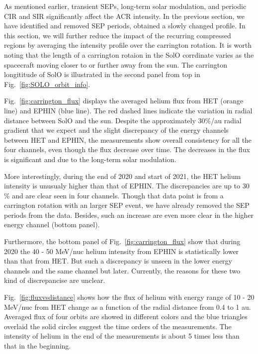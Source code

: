As mentioned earlier, transient \acp{SEP}, long-term solar modulation, and periodic \ac{CIR} and \ac{SIR} significantly affect the \ac{ACR} intensity. In the previous section, we have identified and removed \ac{SEP} periods, obtained a slowly changed profile. In this section, we will further reduce the impact of the recurring compressed regions by averaging the intensity profile over the carrington rotation. It is worth noting that the length of a carrington rotaion in the \ac{SolO} corrdinate varies as the spacecraft moving closer to or further away from the sun. The carrington longititude of \ac{SolO} is illustrated in the second panel from top in Fig.~\ref{fig:SOLO_orbit_info}. 

Fig.~\ref{fig:carrington_flux} displays the averaged helium flux from \ac{HET} (orange line) and \ac{EPHIN} (blue line). The red dashed lines indicate the variation in radial distance between \ac{SolO} and the sun. Despite the approximately 30\%/au radial gradient \citep{Rankin2021ApJ} that we expect and the slight discrepancy of the energy channels between \ac{HET} and \ac{EPHIN}, the measurements show overall consistency for all the four channels, even though the flux decrease over time. The decreases in the flux is significant and due to the long-term solar modulation. 

More interestingly, during the end of 2020 and start of 2021, the \ac{HET} helium intensity is unusualy higher than that of \ac{EPHIN}. The discrepancies are up to 30 \% and are clear seen in four channels. Though that data point is from a carrington rotation with an larger \ac{SEP} event, we have already removed the \ac{SEP} periods from the data. Besides, such an increase are even more clear in the higher energy channel (bottom panel). 

Furthermore, the bottom panel of Fig.~\ref{fig:carrington_flux} show that during 2020  the 40 - 50 MeV/nuc helium intensity from \ac{EPHIN} is statistically lower than that from \ac{HET}. But such a discrepancy is unseen in the lower energy channels and the same channel but later. Currently, the reasons for these two kind of discrepancise are unclear.

Fig.~\ref{fig:fluxvsdistance} shows how the flux of helium with energy range of 10 - 20 MeV/nuc from \ac{HET} change as a function of the radial distance from 0.4 to 1 au. Averaged flux of four orbits are showed in different colors and the blue triangles overlaid the solid circles suggest the time orders of the measurements. The intensity of helium in the end of the measurements is about 5 times less than that in the beginning. 


